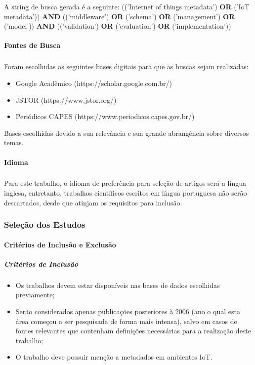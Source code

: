 \quad A string de busca gerada é a seguinte:
(('Internet of things metadata') \textbf{OR} ('IoT metadata')) \textbf{AND} (('middleware') \textbf{OR} ('schema') \textbf{OR} ('management') \textbf{OR} ('model')) \textbf{AND} (('validation') \textbf{OR} ('evaluation') \textbf{OR} ('implementation'))

\paragraph{Fontes de Busca}
\subparagraph{}
 Foram escolhidas as seguintes bases digitais para que as buscas sejam realizadas:
\begin{itemize}
  \item Google Acadêmico (https://scholar.google.com.br/)
  \item JSTOR (https://www.jstor.org/)
  \item Periódicos CAPES (https://www.periodicos.capes.gov.br/)
\end{itemize}
\quad Bases escolhidas devido a sua relevância e sua grande abrangência sobre diversos temas.

\paragraph{Idioma}
\subparagraph{}
\quad Para este trabalho, o idioma de preferência para seleção de artigos será a língua inglesa, entretanto, trabalhos científicos escritos em
língua portuguesa não serão descartados, desde que atinjam os requisitos para inclusão.

\subsubsection{Seleção dos Estudos}
\paragraph{Critérios de Inclusão e Exclusão}
\subparagraph{Critérios de Inclusão}
\begin{itemize}
  \item Os trabalhos devem estar disponíveis nas bases de dados escolhidas previamente;
  \item Serão considerados apenas publicações posteriores à 2006 (ano o qual esta área começou a ser pesquisada de forma mais intensa), salvo em casos de fontes relevantes que contenham definições necessárias para a realização deste trabalho;
  \item O trabalho deve possuir menção a metadados em ambientes \acrlong{IoT}.
\end{itemize}

